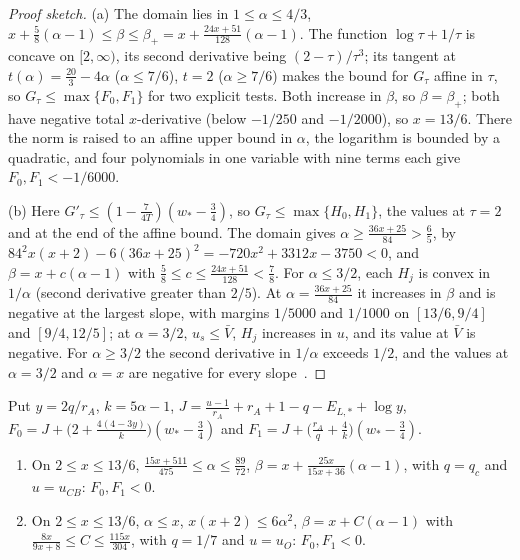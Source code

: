 \begin{proof}[Proof sketch]
(a) The domain lies in $1\le\alpha\le4/3$, $x+\frac58(\alpha-1)\le\beta\le\beta_+=
x+\frac{24x+51}{128}(\alpha-1)$. The function $\log\tau+1/\tau$ is concave on $[2,\infty)$, its
second derivative being $(2-\tau)/\tau^3$; its tangent at $t(\alpha)=\frac{20}3-4\alpha$
($\alpha\le7/6$), $t=2$ ($\alpha\ge7/6$) makes the bound for $G_\tau$ affine in $\tau$, so
$G_\tau\le\max\{F_0,F_1\}$ for two explicit tests. Both increase in $\beta$, so $\beta=\beta_+$;
both have negative total $x$-derivative (below $-1/250$ and $-1/2000$), so $x=13/6$. There the
norm is raised to an affine upper bound in $\alpha$, the logarithm is bounded by a quadratic, and
four polynomials in one variable with nine terms each give $F_0,F_1<-1/6000$.

(b) Here $G'_\tau\le(1-\frac{7}{4T})(w_*-\frac34)$, so $G_\tau\le\max\{H_0,H_1\}$, the values at
$\tau=2$ and at the end of the affine bound. The domain gives $\alpha\ge\frac{36x+25}{84}>\frac65$,
by $84^2x(x+2)-6(36x+25)^2=-720x^2+3312x-3750<0$, and $\beta=x+c(\alpha-1)$ with
$\frac58\le c\le\frac{24x+51}{128}<\frac78$. For $\alpha\le3/2$, each $H_j$ is convex in
$1/\alpha$ (second derivative greater than $2/5$). At $\alpha=\frac{36x+25}{84}$ it increases in
$\beta$ and is negative at the largest slope, with margins $1/5000$ and $1/1000$ on $[13/6,9/4]$
and $[9/4,12/5]$; at $\alpha=3/2$, $u_s\le\bar V$, $H_j$ increases in $u$, and its value at
$\bar V$ is negative. For $\alpha\ge3/2$ the second derivative in $1/\alpha$ exceeds $1/2$, and the
values at $\alpha=3/2$ and $\alpha=x$ are negative for every slope~\cite{LighterProofs}.
\end{proof}

\begin{proposition}\label{prop:ss-face-S3}
Put $y=2q/r_A$, $k=5\alpha-1$, $J=\frac{u-1}{r_A}+r_A+1-q-E_{L,*}+\log y$,
$F_0=J+\bigl(2+\frac{4(4-3y)}k\bigr)(w_*-\frac34)$ and $F_1=J+\bigl(\frac{r_A}q+\frac4k\bigr)
(w_*-\frac34)$.
\begin{enumerate}[label=(\alph*)]
\item On $2\le x\le13/6$, $\frac{15x+511}{475}\le\alpha\le\frac{89}{72}$,
  $\beta=x+\frac{25x}{15x+36}(\alpha-1)$, with $q=q_c$ and $u=u_{CB}$: $F_0,F_1<0$.
\item On $2\le x\le13/6$, $\alpha\le x$, $x(x+2)\le6\alpha^2$, $\beta=x+C(\alpha-1)$ with
  $\frac{8x}{9x+8}\le C\le\frac{115x}{304}$, with $q=1/7$ and $u=u_O$: $F_0,F_1<0$.
\end{enumerate}
\end{proposition}

